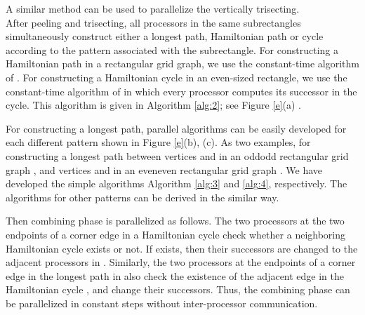 \documentclass[preprint,12pt]{elsarticle}
\begin{document}
A similar method can be used to parallelize the vertically
trisecting.\\
After peeling and trisecting, all processors in the same
subrectangles simultaneously construct either a longest path,
Hamiltonian path or cycle according to the pattern associated with
the subrectangle. For constructing a Hamiltonian path in a
rectangular grid graph, we use the constant-time algorithm of
\cite{CST:AFAFCHPIM}. For constructing a Hamiltonian cycle in an
even-sized rectangle, we use the constant-time algorithm of
\cite{SST:EPPRAOM} in which every processor computes its successor
in the cycle. This algorithm is given in Algorithm \ref{alg:2}; see
Figure \ref{e}(a) .\par For constructing a longest path, parallel
algorithms can be easily developed for each different pattern shown
in  Figure \ref{e}(b), (c). As two examples, for constructing a
longest path between vertices  and  in an
oddodd rectangular grid graph , and vertices
 and  in an eveneven rectangular grid
graph . We have developed the simple algorithms Algorithm
\ref{alg:3} and \ref{alg:4}, respectively. The algorithms for other
patterns can be derived in the similar way. \par Then combining
phase is parallelized as follows.  The two processors at the two
endpoints of a corner edge in a Hamiltonian cycle  check
whether a neighboring Hamiltonian cycle  exists or not. If
 exists, then their successors are changed to the adjacent
processors in . Similarly, the two processors at the endpoints
of a corner edge in the longest path  in  also check the
existence of the adjacent edge in the Hamiltonian cycle , and
change their successors. Thus, the combining phase can be
parallelized in constant steps without inter-processor
communication.
\end{document}
